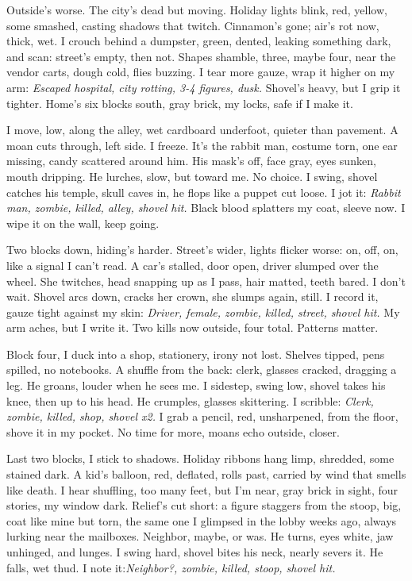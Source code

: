 \documentclass{article}
\begin{document}
Outside's worse. The city's dead but moving. Holiday lights blink, red, yellow, some smashed, casting shadows that twitch. Cinnamon's gone; air's rot now, thick, wet. I crouch behind a dumpster, green, dented, leaking something dark, and scan: street's empty, then not. Shapes shamble, three, maybe four, near the vendor carts, dough cold, flies buzzing. I tear more gauze, wrap it higher on my arm: \textit{Escaped hospital, city rotting, 3-4 figures, dusk.} Shovel's heavy, but I grip it tighter. Home's six blocks south, gray brick, my locks, safe if I make it.

I move, low, along the alley, wet cardboard underfoot, quieter than pavement. A moan cuts through, left side. I freeze. It's the rabbit man, costume torn, one ear missing, candy scattered around him. His mask's off, face gray, eyes sunken, mouth dripping. He lurches, slow, but toward me. No choice. I swing, shovel catches his temple, skull caves in, he flops like a puppet cut loose. I jot it: \textit{Rabbit man, zombie, killed, alley, shovel hit.} Black blood splatters my coat, sleeve now. I wipe it on the wall, keep going.

Two blocks down, hiding's harder. Street's wider, lights flicker worse: on, off, on, like a signal I can't read. A car's stalled, door open, driver slumped over the wheel. She twitches, head snapping up as I pass, hair matted, teeth bared. I don't wait. Shovel arcs down, cracks her crown, she slumps again, still. I record it, gauze tight against my skin: \textit{Driver, female, zombie, killed, street, shovel hit.} My arm aches, but I write it. Two kills now outside, four total. Patterns matter.

Block four, I duck into a shop, stationery, irony not lost. Shelves tipped, pens spilled, no notebooks. A shuffle from the back: clerk, glasses cracked, dragging a leg. He groans, louder when he sees me. I sidestep, swing low, shovel takes his knee, then up to his head. He crumples, glasses skittering. I scribble: \textit{Clerk, zombie, killed, shop, shovel x2.} I grab a pencil, red, unsharpened, from the floor, shove it in my pocket. No time for more, moans echo outside, closer.

Last two blocks, I stick to shadows. Holiday ribbons hang limp, shredded, some stained dark. A kid's balloon, red, deflated, rolls past, carried by wind that smells like death. I hear shuffling, too many feet, but I'm near, gray brick in sight, four stories, my window dark. Relief's cut short: a figure staggers from the stoop, big, coat like mine but torn, the same one I glimpsed in the lobby weeks ago, always lurking near the mailboxes. Neighbor, maybe, or was. He turns, eyes white, jaw unhinged, and lunges. I swing hard, shovel bites his neck, nearly severs it. He falls, wet thud. I note it:\textit{Neighbor?, zombie, killed, stoop, shovel hit.}
\end{document}
